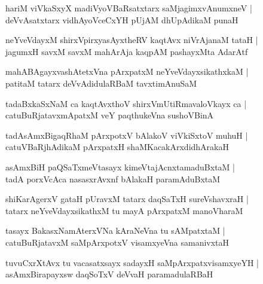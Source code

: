 \documentclass[twoside,12pt,openright]{book}
\newcounter{shloka}[chapter]
\begin{document}
\begin{shloka}%
hariM viVkaSxyX madiVyoVBaRsatxtarx saMjagimxvAnumxneV |\\
deVvAsatxtarx vidhAyoVceCxYH pUjAM dhUpAdikaM punaH 
\end{shloka}

\begin{shloka}%
neYveVdayxM shirxVpirxyasAyxtheRV kaqtAvx niVrAjanaM tataH |\\
jagumxH savxM savxM  mahArAja kaqpAM pashayxMta AdarAtf
\end{shloka}

\begin{shloka}%
mahABAgayxvashAtetxVna pArxpatxM neYveVdayxsikathxkaM |\\
patitaM tatarx deVvAdidulaRBaM tavxtimAnuSaM 
\end{shloka}

\begin{shloka}%
tadaBxkaSxNaM ca kaqtAvxthoV shirxVmUtiRmavaloVkayx ca |\\
catuBuRjatavxmApatxM veY paqthukeVna sushoVBinA 
\end{shloka}

\begin{shloka}%
tadAsAmxBigaqRhaM pArxpotxV bAlakoV viVkiSxtoV muhuH |\\
catuVBaRjhAdikaM pArxpatxH shaMKacakArxdidhArakaH 
\end{shloka}

\begin{shloka}%
asAmxBiH paQSaTxmeVtasayx kimeVtajAcnxtamaduBxtaM |\\
tadA porxVcAca nasasxrAvxnf bAlakaH paramAduBxtaM 
\end{shloka}

\begin{shloka}%
shiKarAgerxV gataH pUravxM tatarx daqSaTxH sureVshavxraH |\\
tatarx neYveVdayxsikathxM tu mayA pArxpatxM manoVharaM 
\end{shloka}

\begin{shloka}%
tasayx BakasxNamAterxVNa kAraNeVna tu sAMpatxtaM |\\
catuBuRjatavxM saMpArxpotxV visamxyeVna samanivxtaH 
\end{shloka}

\begin{shloka}%
tuvuCxrXtAvx tu vacasatxsayx sadayxH saMpArxpatxvisamxyeYH |\\
asAmxBirapayxsw daqSoTxV deVvaH paramadulaRBaH 
\end{shloka}
\end{document}
